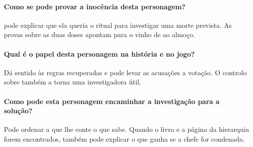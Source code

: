 {{\paragraph{Como se pode provar a inocência desta personagem?}
 pode explicar que ela queria o ritual para investigar uma morte prevista. As provas sobre as duas doses apontam para o vinho de  ao almoço.

\paragraph{Qual é o papel desta personagem na história e no jogo?}
Dá sentido às regras recuperadas e pode levar as acusações a votação. O controlo sobre  também a torna uma investigadora útil.

\paragraph{Como pode esta personagem encaminhar a investigação para a solução?}
Pode ordenar a  que lhe conte o que sabe. Quando o livro e a página da hierarquia forem encontrados, também pode explicar o que  ganha se a chefe for condenada.
}
}
